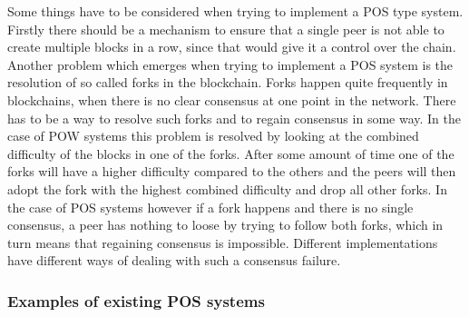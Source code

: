 Some things have to be considered when trying to implement a POS type system. Firstly there should be a mechanism to ensure that a single peer is not able to create multiple blocks in a row, since
that would give it a control over the chain. Another problem which emerges when trying to implement a POS system is the resolution of so called forks in the blockchain. Forks happen
quite frequently in blockchains, when there is no clear consensus at one point in the network. There has to be a way to resolve such forks and to regain consensus in some way. 
In the case of POW systems this problem is resolved by looking at the combined difficulty of the blocks in one of the forks.
After some amount of time one of the forks will have a higher difficulty
compared to the others and the peers will then adopt the fork with the highest combined difficulty and drop all other forks.\cite{url:bitcoin}
In the case of POS systems however if a fork happens and there is no single consensus, a peer has nothing to loose by trying to follow both forks, which in turn means that regaining
consensus is impossible. Different implementations have different ways of dealing with such a consensus failure.\cite{url:pos_impossible}

\subsubsection{Examples of existing POS systems}

